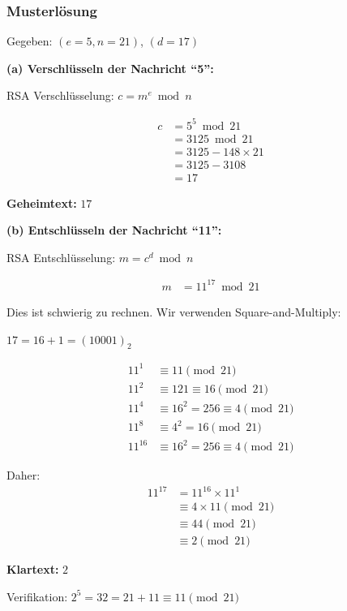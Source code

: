 \documentclass[12pt,a4paper]{article}
\begin{document}
\subsubsection*{Musterlösung}

\begin{tcolorbox}[colback=solutionbg, colframe=black!30]

Gegeben: $(e=5, n=21)$, $(d=17)$

\textbf{(a) Verschlüsseln der Nachricht ``5'':} \checkmark

RSA Verschlüsselung: $c = m^e \bmod n$

\begin{align*}
c &= 5^5 \bmod 21 \\
  &= 3125 \bmod 21 \\
  &= 3125 - 148 \times 21 \\
  &= 3125 - 3108 \\
  &= 17
\end{align*}

\textbf{Geheimtext: } $\boxed{17}$

\textbf{(b) Entschlüsseln der Nachricht ``11'':} \checkmark

RSA Entschlüsselung: $m = c^d \bmod n$

\begin{align*}
m &= 11^{17} \bmod 21
\end{align*}

Dies ist schwierig zu rechnen. Wir verwenden Square-and-Multiply:

$17 = 16 + 1 = (10001)_2$

\begin{align*}
11^1 &\equiv 11 \pmod{21} \\
11^2 &\equiv 121 \equiv 16 \pmod{21} \\
11^4 &\equiv 16^2 = 256 \equiv 4 \pmod{21} \\
11^8 &\equiv 4^2 = 16 \pmod{21} \\
11^{16} &\equiv 16^2 = 256 \equiv 4 \pmod{21}
\end{align*}

Daher:
\begin{align*}
11^{17} &= 11^{16} \times 11^1 \\
       &\equiv 4 \times 11 \pmod{21} \\
       &\equiv 44 \pmod{21} \\
       &\equiv 2 \pmod{21}
\end{align*}

\textbf{Klartext: } $\boxed{2}$

Verifikation: $2^5 = 32 = 21 + 11 \equiv 11 \pmod{21}$ \checkmark

\end{tcolorbox}
\end{document}
